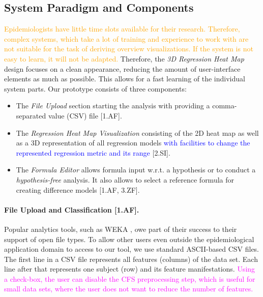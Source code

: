 \documentclass[journal]{style/vgtc} 			          %
\newcommand{\add}[1]{\textcolor{blue}{#1}}
\newcommand{\design}[1]{\textcolor{orange}{#1}}
\newcommand{\magenta}[1]{\textcolor{magenta}{#1}}
\begin{document}
\subsection{System Paradigm and Components}
\design{
Epidemiologists have little time slots available for their research.
Therefore, complex systems, which take a lot of training and experience to work with are not suitable for the task of deriving overview visualizations.
If the system is not easy to learn, it will not be adapted.
}
Therefore, the \emph{3D Regression Heat Map} design focuses on a clean appearance, reducing the amount of user-interface elements as much as possible.
This allows for a fast learning of the individual system parts.
Our prototype consists of three components:
\begin{itemize}
	\item The \emph{File Upload} section starting the analysis with providing a comma-separated value (CSV) file [1.AF].
	\item The \emph{Regression Heat Map Visualization} consisting of the 2D heat map as well as a 3D representation of all regression models \add{with facilities to change the represented regression metric and its range} [2.SI].
	\item The \emph{Formula Editor} allows formula input w.r.t. a hypothesis or to conduct a \emph{hypothesis-free} analysis.
	It also allows to select a reference formula for creating difference models [1.AF, 3.ZF].
\end{itemize}
\paragraph{File Upload and Classification [1.AF].}
Popular analytics tools, such as WEKA \cite{WEKA}, owe part of their success to their support of open file types.
To allow other users even outside the epidemiological application domain to access to our tool, we use standard ASCII-based CSV files.
The first line in a CSV file represents all features (columns) of the data set.
Each line after that represents one subject (row) and its feature manifestations.
\magenta{Using a check-box, the user can disable the CFS preprocessing step, which is useful for small data sets, where the user does not want to reduce the number of features.}
\end{document}
